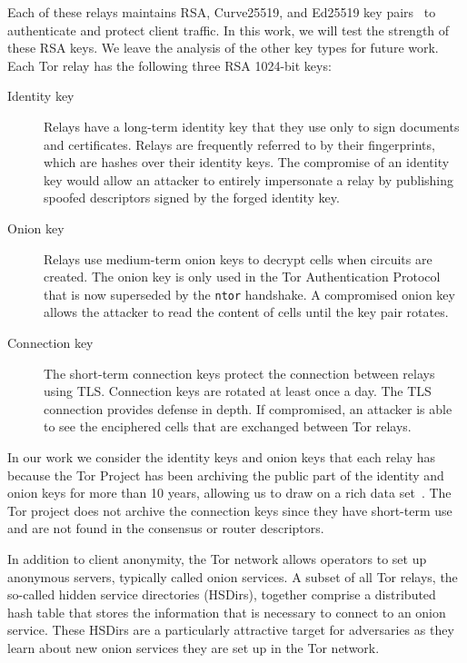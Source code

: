 Each of these relays maintains RSA, Curve25519, and Ed25519 key
pairs~\cite[\S~1.1]{torspec} to authenticate and protect client traffic. In this
work, we will test the strength of these RSA keys.  We leave the analysis of the
other key types for future work.  Each Tor relay has the following three RSA
1024-bit keys:

\begin{description}
    \item[Identity key] Relays have a long-term identity key that they use only
      to sign documents and certificates.  Relays are frequently referred to by
      their fingerprints, which are hashes over their identity keys.  The
      compromise of an identity key would allow an attacker to entirely
      impersonate a relay by publishing spoofed descriptors signed by the
      forged identity key.

    \item[Onion key]  Relays use medium-term onion keys to decrypt cells when
        circuits are created.  The onion key is only used in the Tor
        Authentication Protocol that is now superseded by the \texttt{ntor} 
        handshake.  A compromised onion key allows the attacker to read 
        the content of cells until the key pair rotates.

    \item[Connection key] The short-term connection keys protect the connection
        between relays using TLS.  Connection keys are rotated at least once a
        day.  The TLS connection provides defense in depth.  If compromised, an
        attacker is able to see the enciphered cells that are exchanged between Tor
        relays.
\end{description}

In our work we consider the identity keys and onion keys that each relay 
has because the Tor Project has been archiving the public part of the 
identity and onion keys for more than 10 years, allowing us to draw on a 
rich data set~\cite{collector}. The Tor project does not archive the 
connection keys since they have short-term use and are not found
in the consensus or router descriptors.

In addition to client anonymity, the Tor network allows operators to set up
anonymous servers, typically called onion services.  A subset of all Tor relays,
the so-called hidden service directories (HSDirs), together comprise a
distributed hash table that stores the information that is necessary to connect
to an onion service.  These HSDirs are a particularly attractive target for
adversaries as they learn about new onion services they are set up in the Tor
network.

